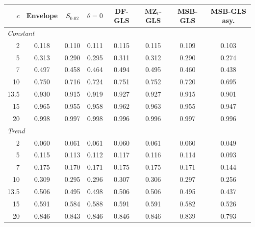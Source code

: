 \begin{tabular}{rccccccc}
\toprule
$c$ & Envelope & $S_{0.02}$ & $\theta = 0$ & DF-GLS & MZ$_t$-GLS & MSB-GLS & MSB-GLS asy.\\
\midrule
\multicolumn{8}{l}{\emph{Constant}}\\
2 & 0.118 & 0.110 & 0.111 & 0.115 & 0.115 & 0.109 & 0.103 \\
5 & 0.313 & 0.290 & 0.295 & 0.311 & 0.312 & 0.290 & 0.274 \\
7 & 0.497 & 0.458 & 0.464 & 0.494 & 0.495 & 0.460 & 0.438 \\
10 & 0.750 & 0.716 & 0.724 & 0.751 & 0.752 & 0.720 & 0.695 \\
13.5 & 0.930 & 0.915 & 0.919 & 0.927 & 0.927 & 0.915 & 0.901 \\
15 & 0.965 & 0.955 & 0.958 & 0.962 & 0.963 & 0.955 & 0.947 \\
20 & 0.998 & 0.997 & 0.998 & 0.996 & 0.996 & 0.997 & 0.996 \\
\multicolumn{8}{l}{\emph{Trend}}\\
2 & 0.060 & 0.061 & 0.061 & 0.060 & 0.061 & 0.060 & 0.049 \\
5 & 0.115 & 0.113 & 0.112 & 0.117 & 0.116 & 0.114 & 0.093 \\
7 & 0.175 & 0.170 & 0.171 & 0.175 & 0.175 & 0.171 & 0.144 \\
10 & 0.309 & 0.295 & 0.296 & 0.307 & 0.306 & 0.297 & 0.256 \\
13.5 & 0.506 & 0.495 & 0.498 & 0.506 & 0.506 & 0.495 & 0.437 \\
15 & 0.591 & 0.584 & 0.588 & 0.591 & 0.591 & 0.582 & 0.526 \\
20 & 0.846 & 0.843 & 0.846 & 0.846 & 0.846 & 0.839 & 0.793 \\
\bottomrule
\end{tabular}
